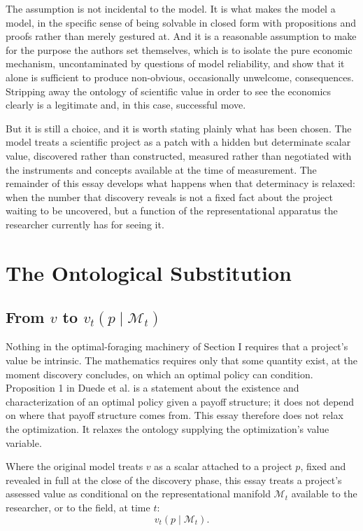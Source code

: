 \documentclass[11pt]{article}
\begin{document}
The assumption is not incidental to the model. It is what makes the model a model, in the specific sense of being solvable in closed form with propositions and proofs rather than merely gestured at. And it is a reasonable assumption to make for the purpose the authors set themselves, which is to isolate the pure economic mechanism, uncontaminated by questions of model reliability, and show that it alone is sufficient to produce non-obvious, occasionally unwelcome, consequences. Stripping away the ontology of scientific value in order to see the economics clearly is a legitimate and, in this case, successful move.

But it is still a choice, and it is worth stating plainly what has been chosen. The model treats a scientific project as a patch with a hidden but determinate scalar value, discovered rather than constructed, measured rather than negotiated with the instruments and concepts available at the time of measurement. The remainder of this essay develops what happens when that determinacy is relaxed: when the number that discovery reveals is not a fixed fact about the project waiting to be uncovered, but a function of the representational apparatus the researcher currently has for seeing it.

\section{The Ontological Substitution}

\subsection{From $v$ to $v_t(p \mid \mathcal{M}_t)$}

Nothing in the optimal-foraging machinery of Section I requires that a project's value be intrinsic. The mathematics requires only that some quantity exist, at the moment discovery concludes, on which an optimal policy can condition. Proposition 1 in Duede et al. is a statement about the existence and characterization of an optimal policy given a payoff structure; it does not depend on where that payoff structure comes from. This essay therefore does not relax the optimization. It relaxes the ontology supplying the optimization's value variable.

Where the original model treats $v$ as a scalar attached to a project $p$, fixed and revealed in full at the close of the discovery phase, this essay treats a project's assessed value as conditional on the representational manifold $\mathcal{M}_t$ available to the researcher, or to the field, at time $t$:
\[
v_t(p \mid \mathcal{M}_t).
\]
\end{document}
